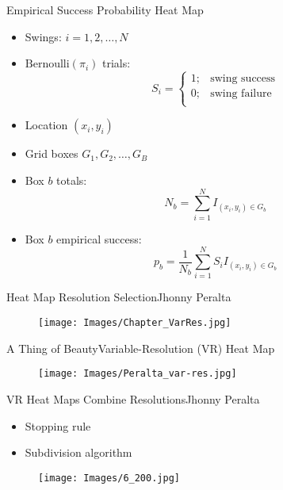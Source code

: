 \documentclass{beamer}
\def\bdm{\begin{displaymath}}
\def\edm{\end{displaymath}}
\begin{document}
\begin{frame}{Empirical Success Probability Heat Map} %

\begin{itemize}
\addtolength{\itemsep}{0.5\baselineskip}
\item Swings: $i = 1,2,\ldots, N$
\item $\text{Bernoulli}(\pi_{i})$ trials:
    \bdm
    S_i = \left\{\begin{array}{ll} 1; & \mbox{swing success} \\
    					 0; & \mbox{swing failure} \\ \end{array} \right.
    \edm
\item Location $(x_i,y_i)$
\item Grid boxes $G_1,G_2,\ldots,G_B$
\item Box $b$ totals:
    \bdm
    N_b = \sum_{i=1}^N I_{(x_i,y_i) \in G_b}
    \edm
\item Box $b$ empirical success:
    \bdm
     p_b = \frac{1}{N_b} \sum_{i=1}^N S_i I_{(x_i,y_i) \in G_b}
    \edm
\end{itemize}
\end{frame}

\begin{frame}{Heat Map Resolution Selection}{Jhonny Peralta}
  \begin{figure}[H]
	\centering
	\texttt{[image: Images/Chapter\_VarRes.jpg]}
	\end{figure}
\end{frame}

\begin{frame}{A Thing of Beauty}{Variable-Resolution (VR) Heat Map}
  \begin{figure}[H]
	\centering
	\texttt{[image: Images/Peralta\_var-res.jpg]}
	\label{fig:interp}
  \end{figure}
\end{frame}

\begin{frame}{VR Heat Maps Combine Resolutions}{Jhonny Peralta}
\begin{itemize}
\item Stopping rule
\item Subdivision algorithm
\end{itemize}
  \begin{figure}[H]
	\centering
	\texttt{[image: Images/6\_200.jpg]}
	\end{figure}
\end{frame}
\end{document}

